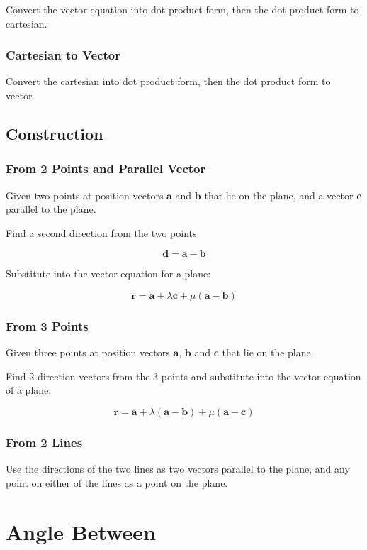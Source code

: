 \documentclass[a4paper,11pt]{article}
\newcommand{\bb}{\boldsymbol}
\begin{document}
Convert the vector equation into dot product form, then the dot product form
to cartesian.


\subsubsection{Cartesian to Vector}

Convert the cartesian into dot product form, then the dot product form to
vector.


\subsection{Construction}

\subsubsection{From 2 Points and Parallel Vector}

Given two points at position vectors $\bb{a}$ and $\bb{b}$ that lie on the
plane, and a vector $\bb{c}$ parallel to the plane.

Find a second direction from the two points:

$$
\bb{d} = \bb{a} - \bb{b}
$$

Substitute into the vector equation for a plane:

$$
\bb{r} = \bb{a} + \lambda \bb{c} + \mu (\bb{a} - \bb{b})
$$


\subsubsection{From 3 Points}

Given three points at position vectors $\bb{a}$, $\bb{b}$ and $\bb{c}$ that lie
on the plane.

Find 2 direction vectors from the 3 points and substitute into the vector
equation of a plane:

$$
\bb{r} = \bb{a} + \lambda (\bb{a} - \bb{b}) + \mu (\bb{a} - \bb{c})
$$


\subsubsection{From 2 Lines}

Use the directions of the two lines as two vectors parallel to the plane, and
any point on either of the lines as a point on the plane.




\section{Angle Between}
\end{document}
